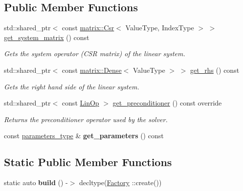 \subsection*{Public Member Functions}
\begin{DoxyCompactItemize}
\item 
std\+::shared\+\_\+ptr$<$ const \hyperlink{classgko_1_1matrix_1_1Csr}{matrix\+::\+Csr}$<$ Value\+Type, Index\+Type $>$ $>$ \hyperlink{classgko_1_1solver_1_1LowerTrs_a1f18336cc86c363eb41da44c2d282497}{get\+\_\+system\+\_\+matrix} () const
\begin{DoxyCompactList}\small\item\em Gets the system operator (C\+SR matrix) of the linear system. \end{DoxyCompactList}\item 
std\+::shared\+\_\+ptr$<$ const \hyperlink{classgko_1_1matrix_1_1Dense}{matrix\+::\+Dense}$<$ Value\+Type $>$ $>$ \hyperlink{classgko_1_1solver_1_1LowerTrs_affe671fab87e0afe2fc1cd0cb125fcc5}{get\+\_\+rhs} () const
\begin{DoxyCompactList}\small\item\em Gets the right hand side of the linear system. \end{DoxyCompactList}\item 
std\+::shared\+\_\+ptr$<$ const \hyperlink{classgko_1_1LinOp}{Lin\+Op} $>$ \hyperlink{classgko_1_1solver_1_1LowerTrs_a9ee1b8b9f5420c4214f22d15bf61e755}{get\+\_\+preconditioner} () const override
\begin{DoxyCompactList}\small\item\em Returns the preconditioner operator used by the solver. \end{DoxyCompactList}\item 
\mbox{\label{classgko_1_1solver_1_1LowerTrs_a1dd87ee6836fff7e9a62f2971f7cc5e1}} 
const \hyperlink{structgko_1_1solver_1_1LowerTrs_1_1parameters__type}{parameters\+\_\+type} \& {\bfseries get\+\_\+parameters} () const
\end{DoxyCompactItemize}
\subsection*{Static Public Member Functions}
\begin{DoxyCompactItemize}
\item 
\mbox{\label{classgko_1_1solver_1_1LowerTrs_a0e54d12a1ae4dd748921c30bfba3c035}} 
static auto {\bfseries build} () -\/$>$ decltype(\hyperlink{classgko_1_1solver_1_1LowerTrs_1_1Factory}{Factory} \+::create())
\end{DoxyCompactItemize}
